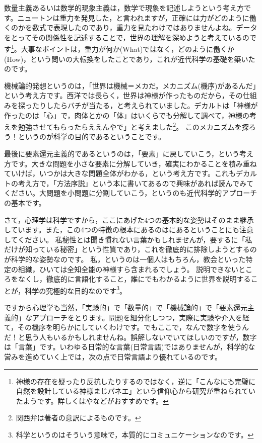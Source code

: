 \documentclass{ltjsbook}
\begin{document}
数量主義あるいは数学的現象主義は，数学で現象を記述しようという考え方です。ニュートンは重力を発見した，と言われますが，正確には力がどのように働くのかを数式で表現したのであり，重力を見たわけではありませんよね。データをとってその関係性を記述することで，世界の理解を深めようと考えているのです\footnote{神様の存在を疑ったり反抗したりするのではなく，逆に「こんなにも完璧に自然を設計している神様まじパネエ」という信仰心から研究が重ねられていたようです。詳しくは\textcite{IkeuchiR2014}や\textcite{Hebizo2016}などがおすすめです。}。大事なポイントは，重力が何か(What)ではなく，どのように働くか(How)，という問いの大転換をしたことであり，これが近代科学の基礎を築いたのです。

機械論的発想というのは，「世界は機械＝メカだ。メカニズム(機序)があるんだ」という考え方です。西洋では長らく，世界は神様が作ったものだから，その仕組みを探ったりしたらバチが当たる，と考えられていました。デカルトは「神様が作ったのは「心」で，肉体とかの「体」はいくらでも分解して調べて，神様の考えを勉強させてもらったらええんやで」と考えました\footnote{関西弁は著者の意訳によるものです。}。
このメカニズムを探ろう！というのが科学の目的であるということです。

最後に要素還元主義的であるというのは，「要素」に戻していこう，という考え方です。大きな問題を小さな要素に分解していき，確実にわかることを積み重ねていけば，いつかは大きな問題全体がわかる，という考え方です。これもデカルトの考え方で，「方法序説」という本に書いてあるので興味があれば読んでみてください\parencite{Descartes}。大問題を小問題に分割していこう，というのも近代科学的アプローチの基本です。

さて，心理学は科学ですから，ここにあげた4つの基本的な姿勢はそのまま継承しています。また，この4つの特徴の根本にあるのはにあるということにも注意してください。
私秘性とは聞き慣れない言葉かもしれませんが，要するに「私だけが知っている秘密」という性質であり，これを徹底的に排除しようとするのが科学的な姿勢なのです。
私，というのは一個人はもちろん，教会といった特定の組織，ひいては全知全能の神様すら含まれるでしょう。
説明できないところをなくし，徹底的に言語化すること，誰にでもわかるように世界を説明することが，科学の究極的な目的なのです\footnote{科学というのはそういう意味で，本質的にコミュニケーションなのです。}。

ですから心理学も当然，「実験的」で「数量的」で「機械論的」で「要素還元主義的」なアプローチをとります。問題を細分化しつつ，実際に実験や介入を経て，その機序を明らかにしていくわけです。でもここで，なんで数字を使うんだ！と思う人もいるかもしれませんね。誤解しないでいてほしいのですが，数字は「言葉」です。いわゆる日常的な言葉(日常言語)ではありませんが，科学的な営みを進めていく上では，次の点で日常言語より優れているのです。
\end{document}
